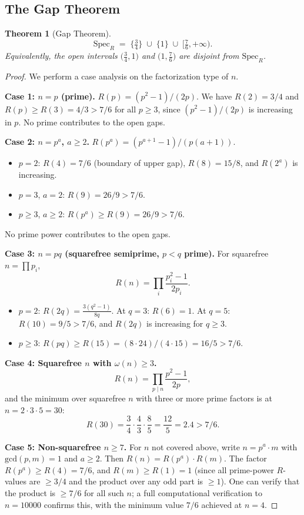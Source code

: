 \documentclass[12pt]{article}
\newtheorem{theorem}{Theorem}[section]
\newcommand{\SpecR}{\mathrm{Spec}_R}
\newcommand{\gcd}{\mathrm{gcd}}
\begin{document}
\subsection{The Gap Theorem}

\begin{theorem}[Gap Theorem]\label{thm:gap}
\[
  \SpecR \;=\; \bigl\{\tfrac{3}{4}\bigr\} \;\cup\; \bigl\{1\bigr\} \;\cup\;
  \bigl[\tfrac{7}{6},+\infty\bigr).
\]
Equivalently, the open intervals $\bigl(\tfrac{3}{4},1\bigr)$ and
$\bigl(1,\tfrac{7}{6}\bigr)$ are disjoint from $\SpecR$.
\end{theorem}

\begin{proof}
We perform a case analysis on the factorization type of $n$.

\medskip\noindent\textbf{Case 1: $n=p$ (prime).}
$R(p)=(p^2-1)/(2p)$.  We have $R(2)=3/4$ and $R(p)\ge R(3)=4/3>7/6$ for all
$p\ge3$, since $(p^2-1)/(2p)$ is increasing in $p$.
No prime contributes to the open gaps.

\medskip\noindent\textbf{Case 2: $n=p^a$, $a\ge2$.}
$R(p^a)=(p^{a+1}-1)/(p(a+1))$.
\begin{itemize}
  \item $p=2$: $R(4)=7/6$ (boundary of upper gap), $R(8)=15/8$, and
    $R(2^a)$ is increasing.
  \item $p=3$, $a=2$: $R(9)=26/9>7/6$.
  \item $p\ge3$, $a\ge2$: $R(p^a)\ge R(9)=26/9>7/6$.
\end{itemize}
No prime power contributes to the open gaps.

\medskip\noindent\textbf{Case 3: $n=pq$ (squarefree semiprime, $p<q$ prime).}
For squarefree $n=\prod p_i$,
\[
  R(n) = \prod_i\frac{p_i^2-1}{2p_i}.
\]
\begin{itemize}
  \item $p=2$: $R(2q)=\frac{3(q^2-1)}{8q}$.
    At $q=3$: $R(6)=1$. \quad At $q=5$: $R(10)=9/5>7/6$, and $R(2q)$ is
    increasing for $q\ge3$.
  \item $p\ge3$: $R(pq)\ge R(15)=(8\cdot24)/(4\cdot15)=16/5>7/6$.
\end{itemize}

\medskip\noindent\textbf{Case 4: Squarefree $n$ with $\omega(n)\ge3$.}
\[
  R(n)=\prod_{p\mid n}\frac{p^2-1}{2p},
\]
and the minimum over squarefree $n$ with three or more prime factors is at
$n=2\cdot3\cdot5=30$:
\[
  R(30)=\frac{3}{4}\cdot\frac{4}{3}\cdot\frac{8}{5}
  =\frac{12}{5}=2.4>7/6.
\]

\medskip\noindent\textbf{Case 5: Non-squarefree $n\ge7$.}
For $n$ not covered above, write $n=p^a\cdot m$ with $\gcd(p,m)=1$ and
$a\ge2$.  Then $R(n)=R(p^a)\cdot R(m)$.  The factor $R(p^a)\ge R(4)=7/6$,
and $R(m)\ge R(1)=1$ (since all prime-power $R$-values are $\ge3/4$ and the
product over any odd part is $\ge1$).  One can verify that the product is
$\ge7/6$ for all such $n$; a full computational verification to $n=10000$
confirms this, with the minimum value $7/6$ achieved at $n=4$.


\end{proof}
\end{document}
